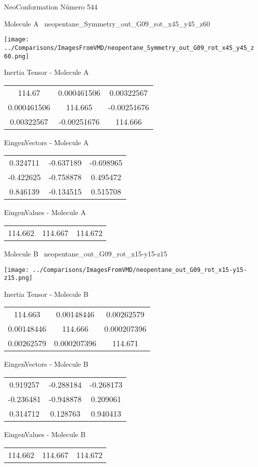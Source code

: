 \vtab[-3cm]
\begin{center}
{\large NeoConformation \tab Número 544}
\end{center}
\begin{multicols}{2}
\begin{center}

Molecule A \
neopentane\_Symmetry\_out\_G09\_rot\_x45\_y45\_z60

\texttt{[image: ../Comparisons/ImagesFromVMD/neopentane\_Symmetry\_out\_G09\_rot\_x45\_y45\_z60.png]}

Inertia Tensor - Molecule A \\
\begin{tabular}{|c c c|}
114.67	 & 	0.000461506	 & 	0.00322567	 \\
0.000461506	 & 	114.665	 & 	-0.00251676	 \\
0.00322567	 & 	-0.00251676	 & 	114.666
\end{tabular}

\vtab
 EingenVectors - Molecule A     \\
\begin{tabular}{|c c c|}
0.324711	 & 	-0.637189	 & 	-0.698965	 \\
-0.422625	 & 	-0.758878	 & 	0.495472	 \\
0.846139	 & 	-0.134515	 & 	0.515708
\end{tabular}

\vtab
 EingenValues - Molecule A     \\
\begin{tabular}{|c c c|}
114.662	 & 	114.667	 & 	114.672	 \\
\end{tabular}
\columnbreak

Molecule B \
neopentane\_out\_G09\_rot\_x15-y15-z15

\texttt{[image: ../Comparisons/ImagesFromVMD/neopentane\_out\_G09\_rot\_x15-y15-z15.png]}

Inertia Tensor - Molecule B \\
\begin{tabular}{|c c c|}
114.663	 & 	0.00148446	 & 	0.00262579	 \\
0.00148446	 & 	114.666	 & 	0.000207396	 \\
0.00262579	 & 	0.000207396	 & 	114.671
\end{tabular}

\vtab
 EingenVectors - Molecule B     \\
\begin{tabular}{|c c c|}
0.919257	 & 	-0.288184	 & 	-0.268173	 \\
-0.236481	 & 	-0.948878	 & 	0.209061	 \\
0.314712	 & 	0.128763	 & 	0.940413
\end{tabular}

\vtab
 EingenValues - Molecule B     \\
\begin{tabular}{|c c c|}
114.662	 & 	114.667	 & 	114.672	 \\
\end{tabular}

\end{center}
\end{multicols}

